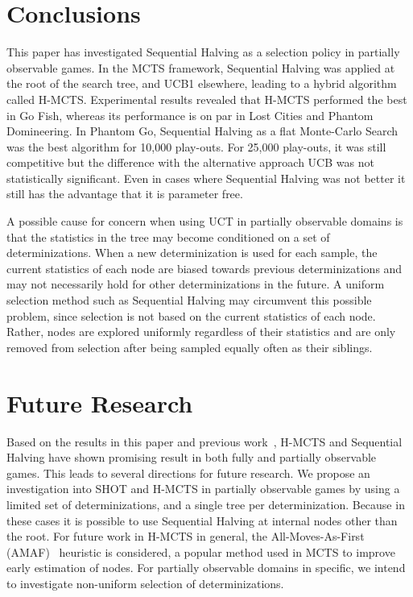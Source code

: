 \documentclass[a4paper]{llncs}
\begin{document}
\section{Conclusions}
\label{sec:concl}

This paper has investigated Sequential Halving as a selection policy in  partially observable games. In the MCTS framework, Sequential Halving was applied at  the root of the search tree, and UCB1 elsewhere, leading to a hybrid algorithm called H-MCTS. Experimental results revealed that H-MCTS performed the best in Go Fish, whereas its performance is on par in Lost Cities and Phantom Domineering.  In Phantom Go, Sequential Halving as a flat Monte-Carlo Search was the best algorithm for 10,000 play-outs. For 25,000 play-outs, it was still competitive but the difference with the alternative approach UCB was not statistically significant. Even in cases where Sequential Halving was not better it still has the advantage that it is parameter free.

A possible cause for concern when using UCT in partially observable domains is that the statistics in the tree may become conditioned on a set of determinizations. When a new determinization is used for each sample, the current statistics of each node are biased towards previous determinizations and may not necessarily hold for other determinizations in the future. A uniform selection method such as Sequential Halving may circumvent this possible problem, since selection is not based on the current statistics of each node. Rather, nodes are explored uniformly regardless of their statistics and are only removed from selection after being sampled equally often as their siblings.

\section{Future Research}
\label{sec:future}

Based on the results in this paper and previous work~\cite{Pepels14hmcts}, H-MCTS and Sequential Halving have shown promising result in both fully and partially observable games. This leads to several directions for future research. We propose an investigation into SHOT and H-MCTS in partially observable games by using a limited set of determinizations, and a single tree per determinization. Because in these cases it is possible to use Sequential Halving at internal nodes other than the root. For future work in H-MCTS in general, the All-Moves-As-First (AMAF)~\cite{bouzy2004monte} heuristic is considered, a popular method used in MCTS to improve early estimation of nodes. For partially observable domains in specific, we intend to investigate non-uniform selection of determinizations.



\end{document}
